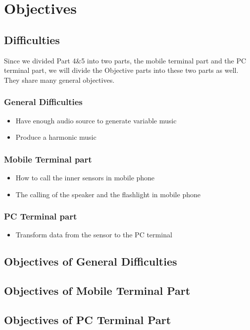 \section{Objectives}
\subsection{Difficulties}
\hspace*{2em}Since we divided Part 4\&5 into two parts, the mobile terminal part and the PC terminal part, we will divide the Objective parts into these two parts as well. They share many general objectives. 

\subsubsection{General Difficulties}
\begin{itemize}
\item Have enough audio source to generate variable music
\item Produce a harmonic music
\end{itemize}

\subsubsection{Mobile Terminal part}
\begin{itemize}
\item How to call the inner sensors in mobile phone
\item The calling of the speaker and the flashlight in mobile phone
\end{itemize}

\subsubsection{PC Terminal part}
\begin{itemize}
\item Transform data from the sensor to the PC terminal
\end{itemize}



\subsection{Objectives of General Difficulties}
\subsection{Objectives of Mobile Terminal Part}
\subsection{Objectives of PC Terminal Part}
